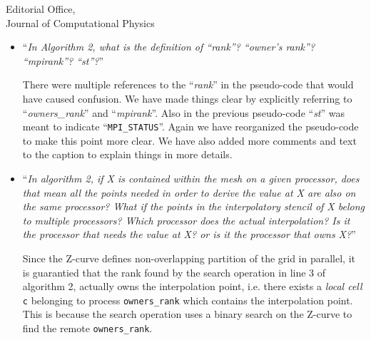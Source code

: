 \documentclass{scrlttr2}
\begin{document}
\begin{letter} {Editorial Office, \\ Journal of Computational
Physics}
\begin{itemize}
\begin{itemize}
Our library is coded in `\texttt{c++}' (with a mix of little `\texttt{c}' code).
We have made adjustments to the to algorithms to make them easier to understand.
However, we believe it is best not to directly use a `\texttt{c++}' syntax to
keep the pseudo-code language-agnostic and accessible to all readers.
\\
\item ``\textit{In Algorithm 2, what is the definition of “rank”? “owner’s
  rank”? “mpirank”? “st”?}''

There were multiple references to the ``\textit{rank}'' in the pseudo-code that 
would have caused confusion. We have made things clear by explicitly referring 
to ``\textit{owners\_rank}'' and ``\textit{mpirank}''. Also in the previous
pseudo-code ``\textit{st}'' was meant to indicate ``\texttt{MPI\_STATUS}''. Again
we have reorganized the pseudo-code to make this point more clear. We have also
added more comments and text to the caption to explain things in more details.
\\
\item ``\textit{In algorithm 2, if X is contained within the mesh on a given
  processor, does that mean all the points needed in order to derive the value
at X are also on the same processor? What if the points in the interpolatory
stencil of X belong to multiple processors? Which processor does the actual
interpolation? Is it the processor that needs the value at X? or is it the
processor that owns X?}''

Since the Z-curve defines non-overlapping partition of the grid in parallel, it
is guarantied that the rank found by the search operation in line 3 of algorithm
2, actually owns the interpolation point, i.e. there exists a \textit{local
cell} \texttt{c} belonging to process \texttt{owners\_rank} which contains the
interpolation point. This is because the search operation uses a binary search
on the Z-curve to find the remote \texttt{owners\_rank}.


\end{itemize}
\end{itemize}
\end{letter}
\end{document}
